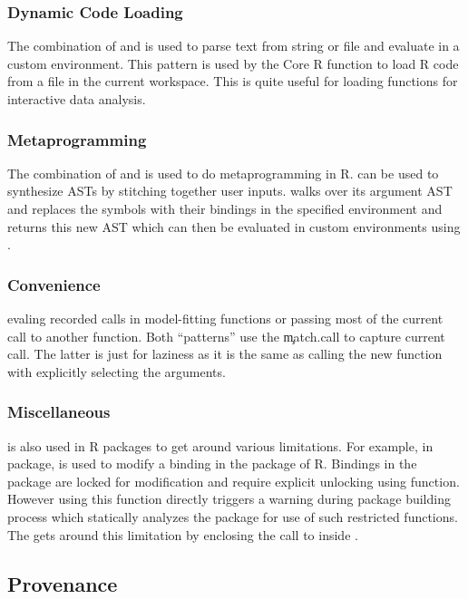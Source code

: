 \documentclass[conference]{IEEEtran}
\begin{document}
  \subsubsection{Dynamic Code Loading} The combination of \parse and \eval is
  used to parse text from string or file and evaluate in a custom environment.
  This pattern is used by the \source Core R function to load R code from a file
  in the current workspace. This is quite useful for loading functions for
  interactive data analysis.

  \subsubsection{Metaprogramming} The combination of \eval and \substitute is
  used to do metaprogramming in R. \substitute can be used to synthesize ASTs by
  stitching together user inputs. \substitute walks over its argument AST and
  replaces the symbols with their bindings in the specified environment and
  returns this new AST which can then be evaluated in custom environments using
  \eval.

  \subsubsection{Convenience}
  evaling recorded calls in model-fitting functions or passing most of the
  current call to another function. Both ``patterns'' use the \c{match.call} to
  capture current call. The latter is just for laziness as it is the same as
  calling the new function with explicitly selecting the arguments.

  \subsubsection{Miscellaneous} \eval is also used in R packages to get around
  various limitations. For example, in \datatable package, \eval is used to modify
  a binding in the \base package of R. Bindings in the \base package are locked
  for modification and require explicit unlocking using \unlockBinding function.
  However using this function directly triggers a warning during package building
  process which statically analyzes the package for use of such restricted
  functions. The \datatable gets around this limitation by enclosing the call to
  \unlockBinding inside \eval.

\subsection{Provenance}
\end{document}
